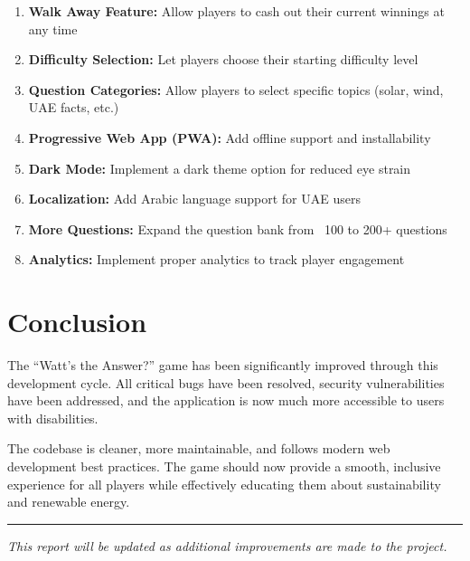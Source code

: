 \documentclass[11pt,a4paper]{article}
\begin{document}
\begin{enumerate}
    \item \textbf{Walk Away Feature:} Allow players to cash out their current winnings at any time
    \item \textbf{Difficulty Selection:} Let players choose their starting difficulty level
    \item \textbf{Question Categories:} Allow players to select specific topics (solar, wind, UAE facts, etc.)
    \item \textbf{Progressive Web App (PWA):} Add offline support and installability
    \item \textbf{Dark Mode:} Implement a dark theme option for reduced eye strain
    \item \textbf{Localization:} Add Arabic language support for UAE users
    \item \textbf{More Questions:} Expand the question bank from ~100 to 200+ questions
    \item \textbf{Analytics:} Implement proper analytics to track player engagement
\end{enumerate}

\section{Conclusion}

The ``Watt's the Answer?'' game has been significantly improved through this development cycle. All critical bugs have been resolved, security vulnerabilities have been addressed, and the application is now much more accessible to users with disabilities.

The codebase is cleaner, more maintainable, and follows modern web development best practices. The game should now provide a smooth, inclusive experience for all players while effectively educating them about sustainability and renewable energy.

\vspace{1cm}
\hrule
\vspace{0.5cm}
\textit{This report will be updated as additional improvements are made to the project.}
\end{document}
